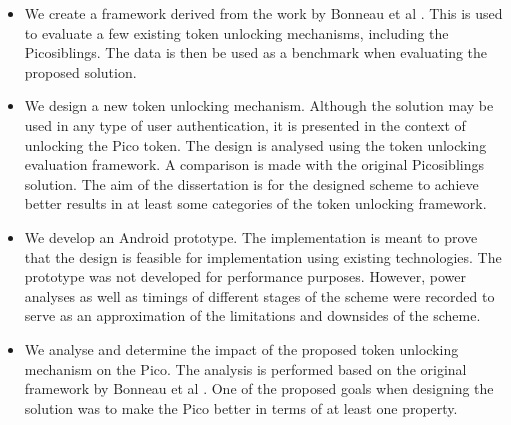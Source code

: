 \begin{itemize}
	\item We create a framework derived from the work by Bonneau et al \cite{bonneau2012quest}. This is used to evaluate a few existing token unlocking mechanisms, including the Picosiblings. The data is then be used as a benchmark when evaluating the proposed solution.
	
	\item We design a new token unlocking mechanism. Although the solution may be used in any type of user authentication, it is presented in the context of unlocking the Pico token. The design is analysed using the token unlocking evaluation framework. A comparison is made with the original Picosiblings solution. The aim of the dissertation is for the designed scheme to achieve better results in at least some categories of the token unlocking framework.
	
	\item We develop an Android prototype. The implementation is meant to prove that the design is feasible for implementation using existing technologies. The prototype was not developed for performance purposes. However, power analyses as well as timings of different stages of the scheme were recorded to serve as an approximation of the limitations and downsides of the scheme.
	
	\item We analyse and determine the impact of the proposed token unlocking mechanism on the Pico. The analysis is performed based on the original framework by Bonneau et al \cite{bonneau2012quest}. One of the proposed goals when designing the solution was to make the Pico better in terms of at least one property.
	
\end{itemize}	
